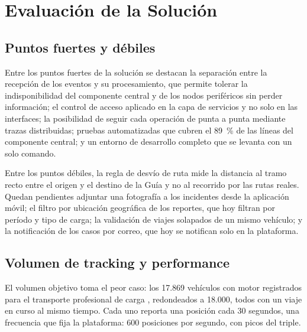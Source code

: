 \section{Evaluación de la Solución}
\subsection{Puntos fuertes y débiles}
Entre los puntos fuertes de la solución se destacan la separación entre la recepción de los eventos y su procesamiento, que permite tolerar la indisponibilidad del componente central y de los nodos periféricos sin perder información; el control de acceso aplicado en la capa de servicios y no solo en las interfaces; la posibilidad de seguir cada operación de punta a punta mediante trazas distribuidas; pruebas automatizadas que cubren el 89~\% de las líneas del componente central; y un entorno de desarrollo completo que se levanta con un solo comando.

Entre los puntos débiles, la regla de desvío de ruta mide la distancia al tramo recto entre el origen y el destino de la Guía y no al recorrido por las rutas reales. Quedan pendientes adjuntar una fotografía a los incidentes desde la aplicación móvil; el filtro por ubicación geográfica de los reportes, que hoy filtran por período y tipo de carga; la validación de viajes solapados de un mismo vehículo; y la notificación de los casos por correo, que hoy se notifican solo en la plataforma.

\subsection{Volumen de tracking y performance}
El volumen objetivo toma el peor caso: los 17.869 vehículos con motor registrados para el transporte profesional de carga \cite{BID2022}, redondeados a 18.000, todos con un viaje en curso al mismo tiempo. Cada uno reporta una posición cada 30 segundos, una frecuencia que fija la plataforma: 600 posiciones por segundo, con picos del triple.

